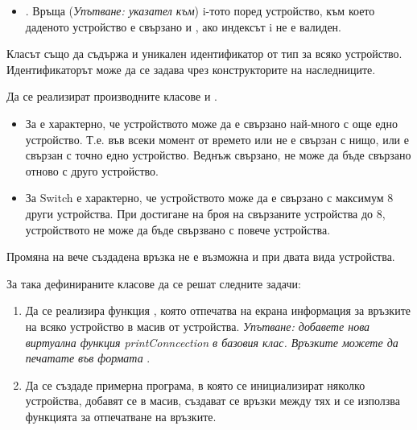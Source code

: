 \begin{enumerate}[resume]
\begin{itemize}
		\item {}. Връща (\textit{Упътване: указател към}) i-тото поред устройство, към което даденото устройство е свързано и , ако индексът i не е валиден.

	\end{itemize}

	Класът  също да съдържа и уникален идентификатор от тип  за всяко устройство. Идентификаторът може да се задава чрез конструкторите на наследниците.

	Да се реализират производните класове  и .

	\begin{itemize}
		\item За  е характерно, че устройството може да е свързано най-много с още едно устройство. Т.е. във всеки момент от времето  или не е свързан с нищо, или е свързан с точно едно устройство. Веднъж свързано,  не може да бъде свързано отново с друго устройство.

		\item За Switch е характерно, че устройството може да е свързано с максимум 8 други устройства. При достигане на броя на свързаните устройства до 8, устройството  не може да бъде свързвано с повече устройства.

	\end{itemize}

	Промяна на вече създадена връзка не е възможна и при двата вида устройства.

	За така дефинираните класове да се решат следните задачи:


	\begin{enumerate}[label=\alph*)]
		\item Да се реализира функция , която отпечатва на екрана информация за връзките на всяко устройство в масив от устройства. \textit{Упътване: добавете нова виртуална функция printConncection в базовия клас. Връзките можете да печатате във формата }.

		\item Да се създаде примерна програма, в която се инициализират няколко устройства, добавят се в масив, създават се връзки между тях и се използва функцията  за отпечатване на връзките.


\end{enumerate}
\end{enumerate}
